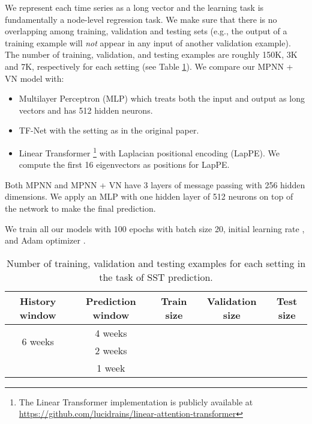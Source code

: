 \documentclass[nohyperref]{article}
\theoremstyle{plain}
\theoremstyle{definition}
\theoremstyle{remark}
\begin{document}
We represent each time series as a long vector and the learning task is fundamentally a node-level regression task. We make sure that there is no overlapping among training, validation and testing sets (e.g., the output of a training example will \textit{not} appear in any input of another validation example). The number of training, validation, and testing examples are roughly 150K, 3K and 7K, respectively for each setting (see Table \ref{tab:noexamples}). We compare our MPNN + VN model with:
\begin{itemize}
\item Multilayer Perceptron (MLP) which treats both the input and output as long vectors and has 512 hidden neurons.
\item TF-Net \cite{Rui2020} with the setting as in the original paper.
\item Linear Transformer \cite{katharopoulos-et-al-2020} \cite{wang2020linformer}\footnote{The Linear Transformer implementation is publicly available at \url{https://github.com/lucidrains/linear-attention-transformer}} with Laplacian positional encoding (LapPE). We compute the first 16 eigenvectors as positions for LapPE.
\end{itemize}
Both MPNN and MPNN + VN have 3 layers of message passing with 256 hidden dimensions. We apply an MLP with one hidden layer of 512 neurons on top of the network to make the final prediction.

We train all our models with 100 epochs with batch size 20, initial learning rate , and Adam optimizer \cite{Adam2014}.

\begin{table}
\caption{\label{tab:noexamples} Number of training, validation and testing examples for each setting in the task of SST prediction.}
\begin{center}
\begin{tabular}{ccccc}
\toprule
\textbf{History window} & \textbf{Prediction window} & \textbf{Train size} & \textbf{Validation size} & \textbf{Test size} \\
\midrule
\multirow{2}{*}{6 weeks} & 4 weeks &  &  &  \\
& 2 weeks &  &  &  \\
& 1 week &  &  &  \\
\bottomrule
\end{tabular}
\end{center}
\end{table}
\end{document}
